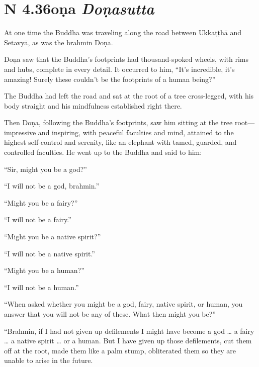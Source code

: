\documentclass[12pt,openany]{book}%
\newcommand*{\suttatitleacronym}[1]{\smaller[2]{#1}\vspace*{.3em}}
\newcommand*{\suttatitletranslation}[1]{\linebreak{#1}}
\newcommand*{\suttatitleroot}[1]{\linebreak\smaller[2]\itshape{#1}}
\newcommand*{\tocacronym}[1]{\hspace*{-3.3em}{#1}\quad}
\newcommand*{\toctranslation}[1]{#1}
\newcommand*{\tocroot}[1]{(\textit{#1})}
\begin{document}
%
\section*{{\suttatitleacronym AN 4.36}{\suttatitletranslation Doṇa }{\suttatitleroot Doṇasutta}}
\addcontentsline{toc}{section}{\tocacronym{AN 4.36} \toctranslation{Doṇa } \tocroot{Doṇasutta}}

At one time the Buddha was traveling along the road between \textsanskrit{Ukkaṭṭhā} and \textsanskrit{Setavyā}, as was the brahmin \textsanskrit{Doṇa}. 

\textsanskrit{Doṇa} saw that the Buddha’s footprints had thousand-spoked wheels, with rims and hubs, complete in every detail. It occurred to him, “It’s incredible, it’s amazing! Surely these couldn’t be the footprints of a human being?” 

The Buddha had left the road and sat at the root of a tree cross-legged, with his body straight and his mindfulness established right there. 

Then \textsanskrit{Doṇa}, following the Buddha’s footprints, saw him sitting at the tree root—impressive and inspiring, with peaceful faculties and mind, attained to the highest self-control and serenity, like an elephant with tamed, guarded, and controlled faculties. He went up to the Buddha and said to him: 

“Sir, might you be a god?” 

“I will not be a god, brahmin.” 

“Might you be a fairy?” 

“I will not be a fairy.” 

“Might you be a native spirit?” 

“I will not be a native spirit.” 

“Might you be a human?” 

“I will not be a human.” 

“When asked whether you might be a god, fairy, native spirit, or human, you answer that you will not be any of these. What then might you be?” 

“Brahmin, if I had not given up defilements I might have become a god … a fairy … a native spirit … or a human. But I have given up those defilements, cut them off at the root, made them like a palm stump, obliterated them so they are unable to arise in the future. 
\end{document}
